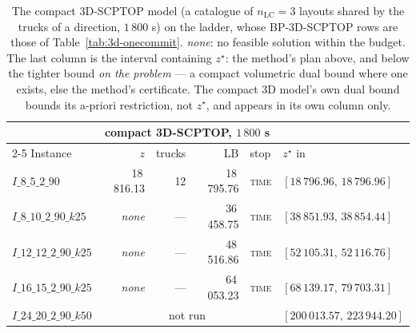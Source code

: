 \begin{table}[!htbp]
\centering
\small
\caption{The compact 3D-SCPTOP model (a catalogue of
$n_{\mathrm{LC}}=3$ layouts shared by the trucks of a direction,
$1\,800$ s) on the ladder, whose BP-3D-SCPTOP rows are those of
Table~\ref{tab:3d-onecommit}. \emph{none}: no feasible solution within
the budget. The last column is the interval containing $z^{\star}$: the
method's plan above, and below the tighter bound \emph{on the problem}
--- a compact volumetric dual bound where one exists, else the
method's certificate. The compact 3D model's own dual bound bounds its
a-priori restriction, not $z^{\star}$, and appears in its own column
only.}
\label{tab:3d-head}
\begin{tabular}{lrrrll}
\toprule
& \multicolumn{4}{c}{compact 3D-SCPTOP, $1\,800$ s} & \\
\cmidrule(lr){2-5}
Instance & $z$ & trucks & LB & stop & $z^{\star}$ in \\
\midrule
$I\_8\_5\_2\_90$ & 18\,816.13 & 12 & 18\,795.76 & \textsc{time} & $[18\,796.96,\,18\,796.96]$ \\
$I\_8\_10\_2\_90\_k25$ & \emph{none} & --- & 36\,458.75 & \textsc{time} & $[38\,851.93,\,38\,854.44]$ \\
$I\_12\_12\_2\_90\_k25$ & \emph{none} & --- & 48\,516.86 & \textsc{time} & $[52\,105.31,\,52\,116.76]$ \\
$I\_16\_15\_2\_90\_k25$ & \emph{none} & --- & 64\,053.23 & \textsc{time} & $[68\,139.17,\,79\,703.31]$ \\
$I\_24\_20\_2\_90\_k50$ & \multicolumn{4}{c}{not run} & $[200\,013.57,\,223\,944.20]$ \\
\bottomrule
\end{tabular}
\end{table}
